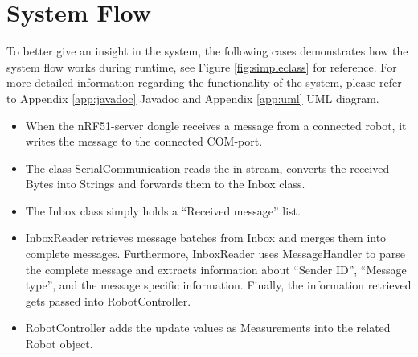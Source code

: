 \newpage
\section{System Flow}
\label{secr:systemflow}
To better give an insight in the system, the following cases demonstrates how the system flow works during runtime, see Figure \ref{fig:simpleclass} for reference. For more detailed information regarding the functionality of the system, please refer to Appendix \ref{app:javadoc} Javadoc and Appendix \ref{app:uml} UML diagram.

\begin{itemize}
    \item When the nRF51-server dongle receives a message from a connected robot, it writes the message to the connected COM-port.
    \item The class SerialCommunication reads the in-stream, converts the received Bytes into Strings and forwards them to the Inbox class.
    \item The Inbox class simply holds a ``Received message'' list.
    \item InboxReader retrieves message batches from Inbox and merges them into complete messages. Furthermore, InboxReader uses MessageHandler to parse the complete message and extracts information about ``Sender ID'', ``Message type'', and the message specific information. Finally, the information retrieved gets passed into RobotController.
    \item RobotController adds the update values as Measurements into the related Robot object.
\end{itemize}

